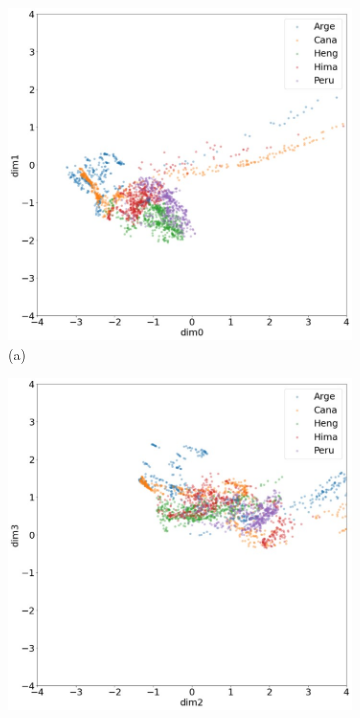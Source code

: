 \documentclass[a4paper, 12pt]{article}
\begin{document}
\begin{figure}
    \centering
    \begin{subfigure}[b]{0.475\textwidth}
        \centering
        \includegraphics[width=\textwidth]{fig/12a.jpg}
        \caption[]%
        {{\small (a)}}
        \label{fig:14}
    \end{subfigure}
    \hfill
    \begin{subfigure}[b]{0.475\textwidth}
        \centering
        \includegraphics[width=\textwidth]{fig/12b.jpg}

\end{subfigure}
\end{figure}
\end{document}
